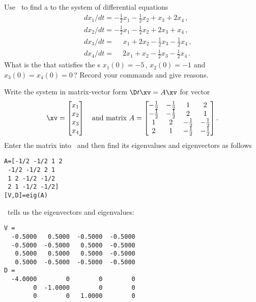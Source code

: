 \begin{example} 
Use \script\ to find a  to the system of differential equations
\begin{eqnarray*}
&&dx_1/dt=-\tfrac12x_1-\tfrac12x_2+x_3+2x_4\,, 
\\&&dx_2/dt=-\tfrac12x_1-\tfrac12x_2+2x_3+x_4\,, 
\\&&dx_3/dt=\phantom{+2} x_1+2x_2-\tfrac12x_3-\tfrac12x_4\,,  
\\&&dx_4/dt=\phantom{+}2x_1+x_2-\tfrac12x_3-\tfrac12x_4\,.
\end{eqnarray*}
What is the  that satisfies the s \(x_1(0)=-5\)\,, \(x_2(0)=-1\) and \(x_3(0)=x_4(0)=0\)\,?
Record your commands and give reasons.
\begin{solution} 
Write the system in matrix-vector form \(\D t\xv=A\xv\) for vector 
\begin{equation*}
\xv=\begin{bmatrix} x_1\\x_2\\x_3\\x_4 \end{bmatrix}
\quad\text{and matrix }
A=\begin{bmatrix} -\tfrac12 & -\tfrac12 & 1 & 2
\\-\tfrac12 & -\tfrac12 & 2 & 1
\\1 & 2 & -\tfrac12 & -\tfrac12
\\2 & 1 & -\tfrac12 & -\tfrac12 \end{bmatrix}.
\end{equation*}
Enter the matrix into \script\ and then find its eigenvalues and eigenvectors as follows
\begin{verbatim}
A=[-1/2 -1/2 1 2
 -1/2 -1/2 2 1
 1 2 -1/2 -1/2
 2 1 -1/2 -1/2]
[V,D]=eig(A)
\end{verbatim}
\setbox\ajrqrbox\hbox{}\marginajrbox%
\script\ tells us the eigenvectors and eigenvalues:
\begin{verbatim}
V =
  -0.5000   0.5000  -0.5000  -0.5000
  -0.5000  -0.5000   0.5000  -0.5000
   0.5000   0.5000   0.5000  -0.5000
   0.5000  -0.5000  -0.5000  -0.5000
D =
  -4.0000        0        0        0
        0  -1.0000        0        0
        0        0   1.0000        0

\end{verbatim}
\end{solution}
\end{example}
